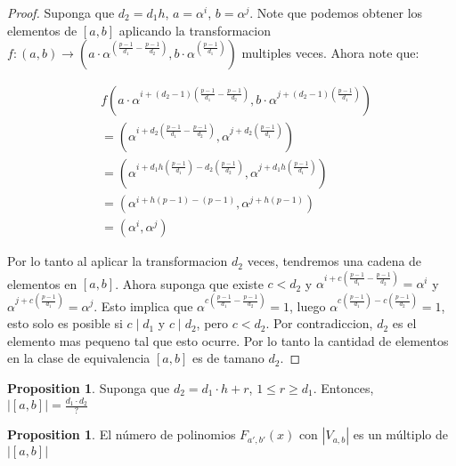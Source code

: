 \documentclass{article}
\theoremstyle{definition}
\newtheorem{prop}[theorem]{Proposition}
\theoremstyle{remark}
\numberwithin{equation}{section}
\begin{document}
\begin{proof}
  Suponga que $d_2 = d_1 h$, $a=\alpha^i$, $b=\alpha^j$. Note que podemos obtener los elementos de $[a,b]$ aplicando la transformacion $f:(a,b) \rightarrow ( a\cdot\alpha^{(\frac{p-1}{d_1} - \frac{p-1}{d_2})}, b\cdot\alpha^{(\frac{p-1}{d_1})} )$ multiples veces. Ahora note que:

  \begin{align}
  & f(a\cdot \alpha^{i+(d_2 - 1)(\frac{p-1}{d_1} - \frac{p-1}{d_2})}, b\cdot\alpha^{j+(d_2 - 1)(\frac{p-1}{d_1})}) \\
  & = (\alpha^{i+d_2(\frac{p-1}{d_1}-\frac{p-1}{d_2})}, \alpha^{j+d_2(\frac{p-1}{d_1})}) \\
  & = (\alpha^{i+d_1 h(\frac{p-1}{d_1})-d_2(\frac{p-1}{d_2})}, \alpha^{j+d_1 h (\frac{p-1}{d_1})}) \\
  & = (\alpha^{i+h(p-1)-(p-1)}, \alpha^{j+h(p-1)}) \\
  & = (\alpha^i, \alpha^j)
  \end{align}

  Por lo tanto al aplicar la transformacion $d_2$ veces, tendremos una cadena de elementos en $[a,b]$. Ahora suponga que existe $c < d_2$ y $\alpha^{i+c(\frac{p-1}{d_1} - \frac{p-1}{d_2})} = \alpha^i$ y $\alpha^{j+c(\frac{p-1}{d_1})} = \alpha^j$. Esto implica que $\alpha^{c(\frac{p-1}{d_1} - \frac{p-1}{d_2})} = 1$, luego $\alpha^{c(\frac{p-1}{d_1}) - c(\frac{p-1}{d_2})} = 1$, esto solo es posible si $c \mid d_1$ y $c \mid d_2$, pero $c < d_2$. Por contradiccion, $d_2$ es el elemento mas pequeno tal que esto ocurre. Por lo tanto la cantidad de elementos en la clase de equivalencia $[ a,b]$ es de tamano $d_2$.
  
\end{proof}

\begin{prop}
  
  Suponga que $d_2 = d_1 \cdot h + r$, $1 \leq r \geq d_1$. Entonces, $|[a, b]| = 
  \frac{d_1 \cdot d_2}{?}$

\end{prop}

\begin{prop}

  El n\'umero de polinomios $F_{a', b'}(x)$ con $|V_{a, b}|$ es un m\'ultiplo de $|[a, b]|$

\end{prop}

 
  
\end{document}
